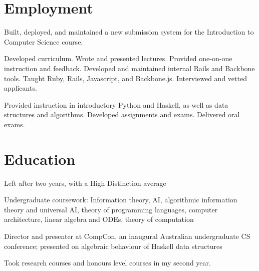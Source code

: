 \documentclass[letterpaper]{resume}
\begin{document}
\author{Buck Shlegeris}
\maketitle

\section{Employment}

\begin{compactitem}
\item Built, deployed, and maintained a new submission system for the Introduction to Computer Science course.
\end{compactitem}


\begin{compactitem}
\item Developed curriculum. Wrote and presented lectures. Provided one-on-one instruction and feedback. Developed and maintained internal Rails and Backbone tools. Taught Ruby, Rails, Javascript, and Backbone.js. Interviewed and vetted applicants.
  
\end{compactitem}


\begin{compactitem}
\item Provided instruction in introductory Python and Haskell, as well as data structures and algorithms. Developed assignments and exams. Delivered oral exams.

\end{compactitem}


\section{Education}


\begin{compactitem}
\item Left after two years, with a High Distinction average
\item Undergraduate coursework: Information theory, AI, algorithmic information theory and universal AI, theory of programming languages, computer architecture, linear algebra and ODEs, theory of computation
\item Director and presenter at CompCon, an inaugural Australian undergraduate CS conference; presented on algebraic behaviour of Haskell data structures
\item Took research courses and honours level courses in my second year.
\end{compactitem}
\end{document}

